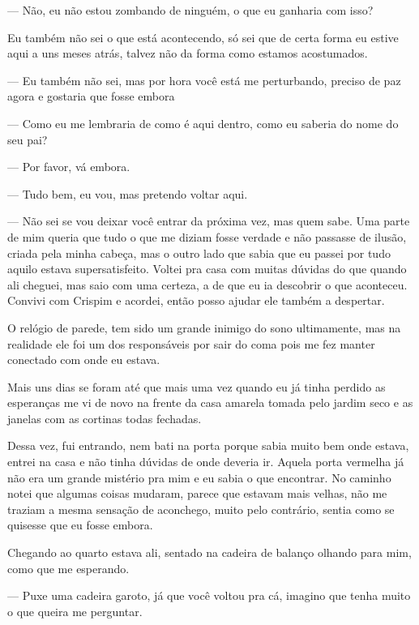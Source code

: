 — Não, eu não estou zombando de ninguém, o que eu ganharia com isso? 

Eu também não sei o que está acontecendo, só sei que de certa forma eu estive aqui a uns meses atrás, talvez não da forma como estamos acostumados.

— Eu também não sei, mas por hora você está me perturbando, preciso de paz agora e gostaria que fosse embora

— Como eu me lembraria de como é aqui dentro, como eu saberia do nome do seu pai?

— Por favor, vá embora.

— Tudo bem, eu vou, mas pretendo voltar aqui.

— Não sei se vou deixar você entrar da próxima vez, mas quem sabe.
Uma parte de mim queria que tudo o que me diziam fosse verdade e não passasse de ilusão, criada pela minha cabeça, mas o outro lado que sabia que eu passei por tudo aquilo estava supersatisfeito. Voltei pra casa com muitas dúvidas do que quando ali cheguei, mas saio com uma certeza, a de que eu ia descobrir o que aconteceu. Convivi com Crispim e acordei, então posso ajudar ele também a despertar.

O relógio de parede, tem sido um grande inimigo do sono ultimamente, mas na realidade ele foi um dos responsáveis por sair do coma pois me fez manter conectado com onde eu estava.

Mais uns dias se foram até que mais uma vez quando eu já tinha perdido as esperanças me vi de novo na frente da casa amarela tomada pelo jardim seco e as janelas com as cortinas todas fechadas.

Dessa vez, fui entrando, nem bati na porta porque sabia muito bem onde estava, entrei na casa e não tinha dúvidas de onde deveria ir. Aquela porta vermelha já não era um grande mistério pra mim e eu sabia o que encontrar. No caminho notei que algumas coisas mudaram, parece que estavam mais velhas, não me traziam a mesma sensação de aconchego, muito pelo contrário, sentia como se quisesse que eu fosse embora. 

Chegando ao quarto estava ali, sentado na cadeira de balanço olhando para mim, como que me esperando.

— Puxe uma cadeira garoto, já que você voltou pra cá, imagino que tenha muito o que queira me perguntar.

